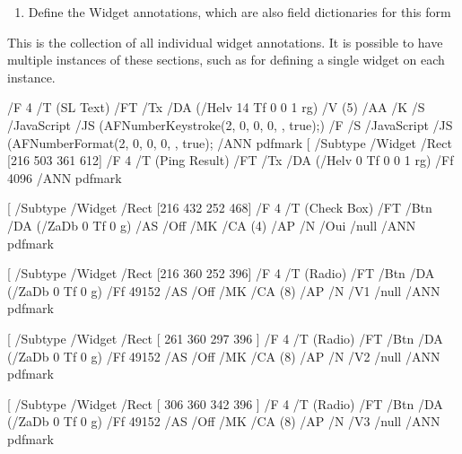 \documentclass[letterpaper,12pt,english,openany,oneside]{sphinxmanual}
\begin{document}
\begin{enumerate}
%
\item {} 
Define the Widget annotations, which are also field dictionaries for this form

\end{enumerate}

This is the collection of all individual widget annotations. It is possible to have multiple instances of these sections, such as for defining a single widget on each instance.

\begin{sphinxVerbatim}[commandchars=\\\{\}]
[    /Subtype /Widget
    /Rect [216 647 361 684]
    /F 4
    /T (SL Text)
    /FT /Tx
    /DA (/Helv 14 Tf 0 0 1 rg)
    /V (5)
    /AA \PYGZlt{}\PYGZlt{}
        /K \PYGZlt{}\PYGZlt{} /S /JavaScript /JS (AFNumber\PYGZus{}Keystroke(2, 0, 0, 0, \PYGZdq{}\PYGZdl{}\PYGZdq{}, true);)\PYGZgt{}\PYGZgt{}
        /F \PYGZlt{}\PYGZlt{} /S /JavaScript /JS (AFNumber\PYGZus{}Format(2, 0, 0, 0, \PYGZdq{}\PYGZdl{}\PYGZdq{}, true); \PYGZgt{}\PYGZgt{}
        \PYGZgt{}\PYGZgt{}
    /ANN pdfmark
    [ /Subtype /Widget
    /Rect [216 503 361 612]
    /F 4
    /T (Ping Result)
    /FT /Tx
    /DA (/Helv 0 Tf 0 0 1 rg)
    /Ff 4096
    /ANN pdfmark



[ /Subtype /Widget
    /Rect [216 432 252 468]
    /F 4
    /T (Check Box)
    /FT /Btn
    /DA (/ZaDb 0 Tf 0 g)
    /AS /Off
    /MK \PYGZlt{}\PYGZlt{} /CA (4)\PYGZgt{}\PYGZgt{}
    /AP \PYGZlt{}\PYGZlt{} /N \PYGZlt{}\PYGZlt{} /Oui /null \PYGZgt{}\PYGZgt{} \PYGZgt{}\PYGZgt{}
    /ANN pdfmark


[ /Subtype /Widget
    /Rect [216 360 252 396]
    /F 4
    /T (Radio)
    /FT /Btn
    /DA (/ZaDb 0 Tf 0 g)
    /Ff 49152
    /AS /Off
    /MK \PYGZlt{}\PYGZlt{} /CA (8)\PYGZgt{}\PYGZgt{}
    /AP \PYGZlt{}\PYGZlt{} /N \PYGZlt{}\PYGZlt{} /V1 /null \PYGZgt{}\PYGZgt{} \PYGZgt{}\PYGZgt{}
    /ANN pdfmark


[ /Subtype /Widget
    /Rect [ 261 360 297 396 ]
    /F 4
    /T (Radio)
    /FT /Btn
    /DA (/ZaDb 0 Tf 0 g)
    /Ff 49152
    /AS /Off
    /MK \PYGZlt{}\PYGZlt{} /CA (8)\PYGZgt{}\PYGZgt{}
    /AP \PYGZlt{}\PYGZlt{} /N \PYGZlt{}\PYGZlt{} /V2 /null \PYGZgt{}\PYGZgt{} \PYGZgt{}\PYGZgt{}
    /ANN pdfmark


[ /Subtype /Widget
    /Rect [ 306 360 342 396 ]
    /F 4
    /T (Radio)
    /FT /Btn
    /DA (/ZaDb 0 Tf 0 g)
    /Ff 49152
    /AS /Off
    /MK \PYGZlt{}\PYGZlt{} /CA (8)\PYGZgt{}\PYGZgt{}
    /AP \PYGZlt{}\PYGZlt{} /N \PYGZlt{}\PYGZlt{} /V3 /null \PYGZgt{}\PYGZgt{} \PYGZgt{}\PYGZgt{}
    /ANN pdfmark



\end{sphinxVerbatim}
\end{document}
